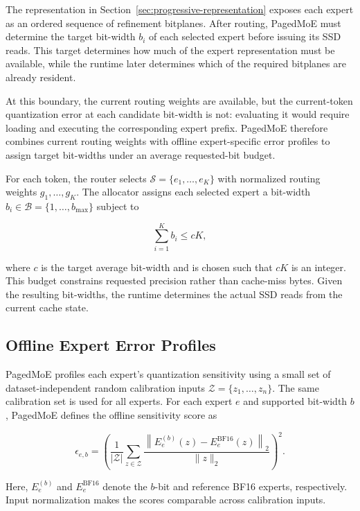 \documentclass[sigconf, nonacm]{acmart}
\begin{document}
The representation in Section~\ref{sec:progressive-representation} exposes
each expert as an ordered sequence of refinement bitplanes. After routing,
PagedMoE must determine the target bit-width \(b_i\) of each selected expert
before issuing its SSD reads. This target determines how much of the expert
representation must be available, while the runtime later determines which
of the required bitplanes are already resident.

At this boundary, the current routing weights are available, but the
current-token quantization error at each candidate bit-width is not:
evaluating it would require loading and executing the corresponding expert
prefix. PagedMoE therefore combines current routing weights with offline
expert-specific error profiles to assign target bit-widths under an average
requested-bit budget.

For each token, the router selects
\(\mathcal{S}=\{e_1,\ldots,e_K\}\) with normalized routing weights
\(g_1,\ldots,g_K\). The allocator assigns each selected expert a bit-width
\(b_i\in\mathcal{B}=\{1,\ldots,b_{\max}\}\) subject to

\[
\sum_{i=1}^{K} b_i \leq cK,
\]

where \(c\) is the target average bit-width and is chosen such that
\(cK\) is an integer. This budget constrains requested precision rather
than cache-miss bytes. Given the resulting bit-widths, the
runtime determines the actual SSD reads from the current cache state.

\subsection{Offline Expert Error Profiles}
\label{sec:expert-error-profiles}

PagedMoE profiles each expert's quantization sensitivity using a small
set of dataset-independent random calibration inputs
\(\mathcal{Z}=\{z_1,\ldots,z_n\}\). The same calibration set is used
for all experts. For each expert \(e\) and supported bit-width \(b\),
PagedMoE defines the offline sensitivity score as

\[
\epsilon_{e,b}
=
\left(
\frac{1}{|\mathcal{Z}|}
\sum_{z\in\mathcal{Z}}
\frac{
\left\|
E_e^{(b)}(z)-E_e^{\mathrm{BF16}}(z)
\right\|_2
}{
\|z\|_2
}
\right)^2.
\]

Here, \(E_e^{(b)}\) and \(E_e^{\mathrm{BF16}}\) denote the
\(b\)-bit and reference BF16 experts, respectively. Input normalization
makes the scores comparable across calibration inputs. 
\end{document}
